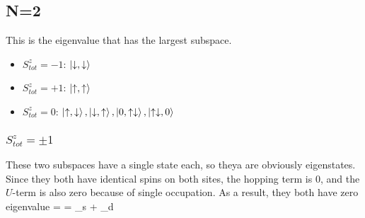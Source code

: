 \documentclass[12pt]{article}
\begin{document}
\subsection{N=2}
This is the eigenvalue that has the largest subspace.
\begin{itemize}
\item \(S_{tot}^z = -1\): \(\ket{\downarrow,\downarrow}\)
\item \(S_{tot}^z = +1\): \(\ket{\uparrow,\uparrow}\)
\item \(S_{tot}^z = 0\):  \(\ket{\uparrow,\downarrow},\ket{\downarrow,\uparrow},\ket{0,\uparrow\downarrow},\ket{\uparrow\downarrow,0}\)
\end{itemize}

\subsubsection{\(S_{tot}^z = \pm 1\)}
These two subspaces have a single state each, so theya are obviously eigenstates. Since they both have identical spins on both sites, the hopping term is 0, and the \(U\)-term is also zero because of single occupation. As a result, they both have zero eigenvalue
\beq
\ham \ket{\downarrow,\downarrow} = \ham \ket{\uparrow,\uparrow} = \epsilon_s + \epsilon_d
\eeq
\end{document}
